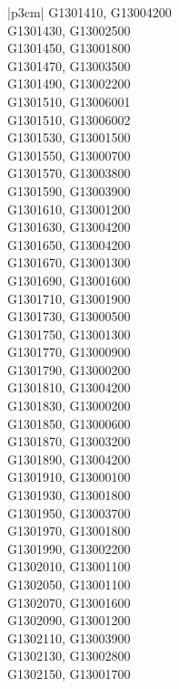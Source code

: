 \begin{customLongTable}{ |p{3cm}| }
G1301410, G13004200 \\ \hline
G1301430, G13002500 \\ \hline
G1301450, G13001800 \\ \hline
G1301470, G13003500 \\ \hline
G1301490, G13002200 \\ \hline
G1301510, G13006001 \\ \hline
G1301510, G13006002 \\ \hline
G1301530, G13001500 \\ \hline
G1301550, G13000700 \\ \hline
G1301570, G13003800 \\ \hline
G1301590, G13003900 \\ \hline
G1301610, G13001200 \\ \hline
G1301630, G13004200 \\ \hline
G1301650, G13004200 \\ \hline
G1301670, G13001300 \\ \hline
G1301690, G13001600 \\ \hline
G1301710, G13001900 \\ \hline
G1301730, G13000500 \\ \hline
G1301750, G13001300 \\ \hline
G1301770, G13000900 \\ \hline
G1301790, G13000200 \\ \hline
G1301810, G13004200 \\ \hline
G1301830, G13000200 \\ \hline
G1301850, G13000600 \\ \hline
G1301870, G13003200 \\ \hline
G1301890, G13004200 \\ \hline
G1301910, G13000100 \\ \hline
G1301930, G13001800 \\ \hline
G1301950, G13003700 \\ \hline
G1301970, G13001800 \\ \hline
G1301990, G13002200 \\ \hline
G1302010, G13001100 \\ \hline
G1302050, G13001100 \\ \hline
G1302070, G13001600 \\ \hline
G1302090, G13001200 \\ \hline
G1302110, G13003900 \\ \hline
G1302130, G13002800 \\ \hline
G1302150, G13001700 \\ \hline

\end{customLongTable}
